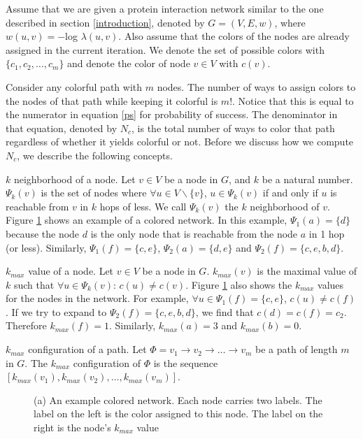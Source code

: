 \documentclass{ws-procs11x85}
\begin{document}
Assume that we are given a protein interaction network similar to the one
described in section \ref{introduction}, denoted by $G = (V, E, w)$, where
$w(u, v) = -$log $\lambda(u, v)$. Also assume that the colors of the nodes are
already assigned in the current iteration. We denote the set of possible colors
with $\{c_1, c_2, \ldots , c_m\}$ and denote the color of node $v \in V$ with
$c(v)$.

Consider any colorful path with $m$ nodes. The number of ways to assign colors
to the nodes of that path while keeping it colorful is $m!$. Notice that this is
equal to the numerator in equation \ref{ps} for probability of success. The
denominator in that equation, denoted by $N_c$, is the total number of ways to
color that path regardless of whether it yields colorful or not. Before we
discuss how we compute $N_c$, we describe the following concepts.

\begin{arabiclist}[3]
\item $k$ neighborhood of a node. Let $v \in V$ be a node in $G$, and $k$ be a
natural number. $\Psi_k(v)$ is the set of nodes where $\forall u \in V
\backslash \{v\}$, $u \in \Psi_k(v)$ if and only if $u$ is reachable from $v$
in $k$ hops of less. We call $\Psi_k(v)$ the $k$ neighborhood of $v$. Figure
\ref{colors} shows an example of a colored network. In this example, $\Psi_1(a)
= \{d\}$ because the node $d$ is the only node that is reachable from the
node $a$ in 1 hop (or less). Similarly, $\Psi_1(f) = \{c, e\}$, $\Psi_2(a) =
\{d, e\}$ and $\Psi_2(f) = \{c, e, b, d\}$.
\item $k_{max}$ value of a node. Let $v \in V$ be a node in $G$. $k_{max}(v)$ is
the maximal value of $k$ such that $\forall u \in \Psi_k(v)$: $c(u) \neq c(v)$.
Figure \ref{colors} also shows the $k_{max}$ values for the nodes in the
network. For example, $\forall u \in \Psi_1(f) = \{c, e\}$, $c(u) \neq
c(f)$. If we try to expand to $\Psi_2(f) = \{c, e, b, d\}$, we find that $c(d)
= c(f) = c_2$. Therefore $k_{max}(f) = 1$. Similarly, $k_{max}(a) = 3$ and
$k_{max}(b) = 0$.
\item $k_{max}$
configuration of a path. Let $\Phi = v_1 \rightarrow v_2 \rightarrow \ldots \rightarrow v_m$ be a path of length $m$ in $G$. The
$k_{max}$ configuration of $\Phi$ is the sequence $[k_{max}(v_1),
k_{max}(v_2), \ldots , k_{max}(v_m)]$.
\end{arabiclist}


\begin{figure}[h]
\centerline{}
\caption{(a) An example colored network. Each node carries two labels. The
label on the left is the color assigned to this node. The label on the right is
the node's $k_{max}$ value}
\label{colors}
\end{figure}
\end{document}
